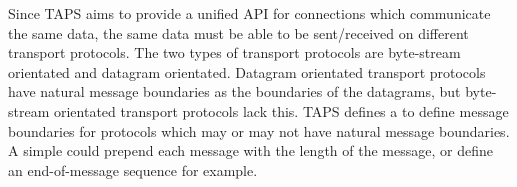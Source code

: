 Since TAPS aims to provide a unified API for connections which communicate the same data, the same data must be able to
be sent/received on different transport protocols.
The two types of transport protocols are byte-stream orientated and datagram orientated.
Datagram orientated transport protocols have natural message boundaries as the boundaries of the datagrams, but
byte-stream orientated transport protocols lack this.
TAPS defines a \framer{} to define message boundaries for protocols which may or may not have natural message
boundaries.
A simple \framer{} could prepend each message with the length of the message, or define an end-of-message sequence for
example.


